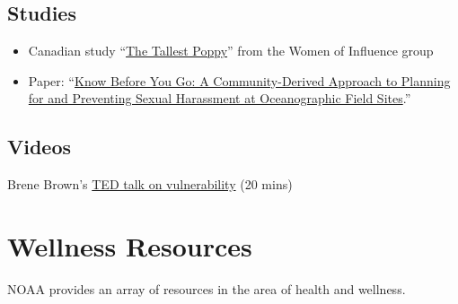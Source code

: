 \documentclass[
  letterpaper,
  DIV=11,
  numbers=noendperiod]{scrreprt}
\begin{document}
\section{Studies}\label{studies}

\begin{itemize}
\item
  Canadian study ``\href{https://www.womenofinfluence.ca/tps/}{The
  Tallest Poppy}'' from the Women of Influence group
\item
  Paper: ``\href{https://doi.org/10.5670/oceanog.2023.112}{Know Before
  You Go: A Community-Derived Approach to Planning for and Preventing
  Sexual Harassment at Oceanographic Field Sites}.''
\end{itemize}

\section{Videos}\label{videos}

Brene Brown's
\href{https://brenebrown.com/videos/ted-talk-the-power-of-vulnerability/}{TED
talk on vulnerability} (20 mins)

\chapter{Wellness Resources}\label{wellness-resources}

NOAA provides an array of resources in the area of health and wellness.
\end{document}
